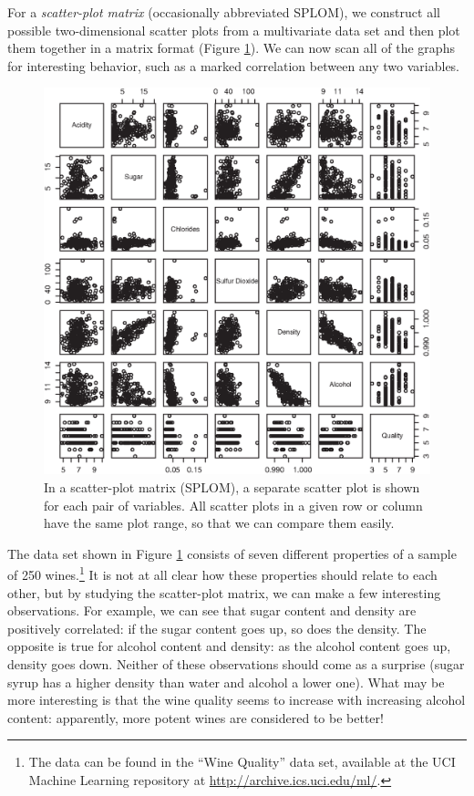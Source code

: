 
For a \emph{scatter-plot matrix} (occasionally abbreviated SPLOM), we
construct all possible two-dimensional scatter plots from a
multivariate data set and then plot them together in a matrix format
(Figure \ref{fig:splom}). We can now scan all of the graphs for
interesting behavior, such as a marked correlation between any two
variables.

\begin{figure}
  \includegraphics[width=\textwidth]{img/splom.eps}
  \caption{In a scatter-plot matrix (SPLOM), a separate scatter plot is
    shown for each pair of variables. All scatter plots in a given row
    or column have the same plot range, so that we can compare them
    easily.}
  \label{fig:splom}\vspace*{-6pt}
\end{figure}

The data set shown in Figure \ref{fig:splom} consists of seven
different properties of a sample of 250 wines.\footnote{The data can
  be found in the ``Wine Quality'' data set, available at the UCI
  Machine Learning repository at
  \url{http://archive.ics.uci.edu/ml/}.} It is not
at all clear how these properties should relate to each other, but by
studying the scatter-plot matrix, we can make a few interesting
observations. For example, we can see that sugar content and density
are positively correlated: if the sugar content goes up, so does the
density. The opposite is true for alcohol content and density: as the
alcohol content goes up, density goes down. Neither of these
observations should come as a surprise (sugar syrup has a higher
density than water and alcohol a lower one). What may be more interesting
is that the wine quality seems to increase with increasing alcohol
content: apparently, more potent wines are considered to be better!

